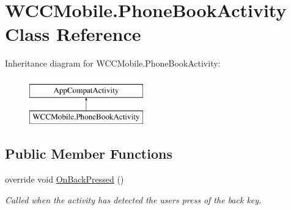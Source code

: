\hypertarget{class_w_c_c_mobile_1_1_phone_book_activity}{}\section{W\+C\+C\+Mobile.\+Phone\+Book\+Activity Class Reference}
\label{class_w_c_c_mobile_1_1_phone_book_activity}
Inheritance diagram for W\+C\+C\+Mobile.\+Phone\+Book\+Activity\+:\begin{figure}[H]
\begin{center}
\leavevmode
\includegraphics[height=2.000000cm]{class_w_c_c_mobile_1_1_phone_book_activity}
\end{center}
\end{figure}
\subsection*{Public Member Functions}
\begin{DoxyCompactItemize}
\item 
override void \hyperlink{class_w_c_c_mobile_1_1_phone_book_activity_a254e05dc84e87be335afd54b3e8f17ec}{On\+Back\+Pressed} ()
\begin{DoxyCompactList}\small\item\em Called when the activity has detected the user\textquotesingle{}s press of the back key. \end{DoxyCompactList}\end{DoxyCompactItemize}
